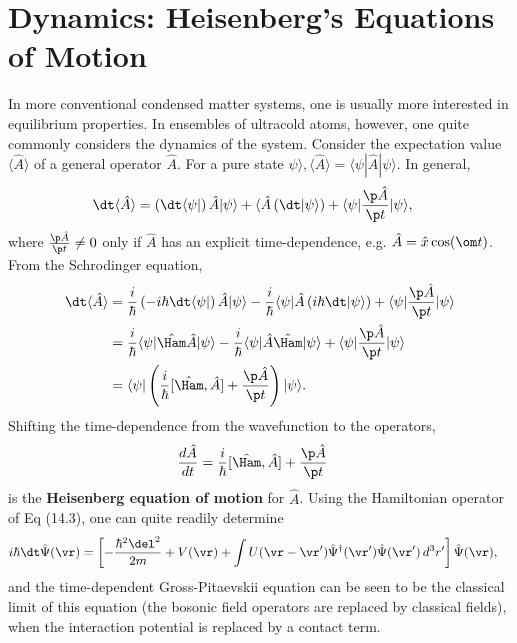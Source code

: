 \documentclass[a4paper, 11pt, normalem]{report}
\begin{document}
\section{Dynamics: Heisenberg's Equations of Motion}
In more conventional condensed matter systems, one is usually more interested in equilibrium properties.
In ensembles of ultracold atoms, however, one quite commonly considers the dynamics of the system.
Consider the expectation value $\langle\hat{A}\rangle$ of a general operator $\hat{A}$.
For a pure state $\psi\rangle,\langle\hat{A}\rangle=\langle\psi|\hat{A}|\psi\rangle$.
In general,
\begin{align}
    \dt\langle\hat{A}\rangle &= \left(\dt\langle\psi|\right)\hat{A}|\psi\rangle + \langle\hat{A}\left(\dt|\psi\rangle\right) + \langle\psi|\frac{\p\hat{A}}{\p t}|\psi\rangle,
\end{align}
where $\frac{\p\hat{A}}{\p t}\neq0$ only if $\hat{A}$ has an explicit time-dependence, e.g. $\hat{A}=\hat{x}\cos(\om t)$.
From the Schrodinger equation,
\begin{align}
    \begin{split}
        \dt\langle\hat{A}\rangle &= \frac{i}{\hbar}\left(-i\hbar\dt\langle\psi|\right)\hat{A}|\psi\rangle - \frac{i}{\hbar}\langle\psi|\hat{A}\left(i\hbar\dt|\psi\rangle\right) + \langle\psi|\frac{\p\hat{A}}{\p t}|\psi\rangle \\
                                 &= \frac{i}{\hbar}\langle\psi|\hat{\Ham}\hat{A}|\psi\rangle - \frac{i}{\hbar}\langle\psi|\hat{A}\hat{\Ham}|\psi\rangle + \langle\psi|\frac{\p\hat{A}}{\p t}|\psi\rangle \\
                                 &= \langle\psi|\left(\frac{i}{\hbar}[\hat{\Ham},\hat{A}]+\frac{\p\hat{A}}{\p t}\right)|\psi\rangle.
    \end{split}
\end{align}
Shifting the time-dependence from the wavefunction to the operators,
\begin{align}
    \frac{d\hat{A}}{dt} &= \frac{i}{\hbar}[\hat{\Ham},\hat{A}]+\frac{\p\hat{A}}{\p t}
\end{align}
is the \textbf{Heisenberg equation of motion} for $\hat{A}$.
Using the Hamiltonian operator of Eq (14.3), one can quite readily determine
\begin{align}
    i\hbar\dt\hat{\Psi}(\vr) &= \left[-\frac{\hbar^2\del^2}{2m}+V(\vr)+\int U(\vr-\vr')\hat{\Psi}^\dagger(\vr')\hat{\Psi}(\vr')\,d^3r'\right]\hat{\Psi}(\vr),
\end{align}
and the time-dependent Gross-Pitaevskii equation can be seen to be the classical limit of this equation (the bosonic field operators are replaced by classical fields), when the interaction potential is replaced by a contact term.
\end{document}
